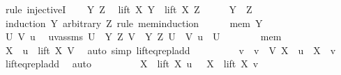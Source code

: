\begin{isabellebody}
\isamarkupfalse%
\ {\isacharparenleft}{\kern0pt}rule\ injectiveI{\isacharparenright}{\kern0pt}\isanewline
\ \ \isamarkupfalse%
\ Y\ Z\ \isamarkupfalse%
\ {\isachardoublequoteopen}lift\ X\ Y\ {\isacharequal}{\kern0pt}\ lift\ X\ Z{\isachardoublequoteclose}\isanewline
\ \ \isamarkupfalse%
\ \isamarkupfalse%
\ {\isachardoublequoteopen}Y\ {\isacharequal}{\kern0pt}\ Z{\isachardoublequoteclose}\isanewline
\ \ \isamarkupfalse%
\ {\isacharparenleft}{\kern0pt}induction\ Y\ arbitrary{\isacharcolon}{\kern0pt}\ Z\ rule{\isacharcolon}{\kern0pt}\ mem{\isacharunderscore}{\kern0pt}induction{\isacharparenright}{\kern0pt}\isanewline
\ \ \ \ \isamarkupfalse%
\ {\isacharparenleft}{\kern0pt}mem\ Y{\isacharparenright}{\kern0pt}\isanewline
\ \ \ \ \isacommand{{\isacharbraceleft}{\kern0pt}}\isamarkupfalse%
\isanewline
\ \ \ \ \ \ \isamarkupfalse%
\ U\ V\ u\ \isamarkupfalse%
\ uvassms{\isacharcolon}{\kern0pt}\ {\isachardoublequoteopen}U\ {\isasymin}\ {\isacharbraceleft}{\kern0pt}Y{\isacharcomma}{\kern0pt}\ Z{\isacharbraceright}{\kern0pt}{\isachardoublequoteclose}\ {\isachardoublequoteopen}V\ {\isasymin}\ {\isacharbraceleft}{\kern0pt}Y{\isacharcomma}{\kern0pt}\ Z{\isacharbraceright}{\kern0pt}{\isachardoublequoteclose}\ {\isachardoublequoteopen}U\ {\isasymnoteq}\ V{\isachardoublequoteclose}\ {\isachardoublequoteopen}u\ {\isasymin}\ U{\isachardoublequoteclose}\isanewline
\ \ \ \ \ \ \isamarkupfalse%
\ mem\ \isamarkupfalse%
\ {\isachardoublequoteopen}X\ {\isacharplus}{\kern0pt}\ u\ {\isasymin}\ lift\ X\ V{\isachardoublequoteclose}\ \isamarkupfalse%
\ {\isacharparenleft}{\kern0pt}auto\ simp{\isacharcolon}{\kern0pt}\ lift{\isacharunderscore}{\kern0pt}eq{\isacharunderscore}{\kern0pt}repl{\isacharunderscore}{\kern0pt}add{\isacharparenright}{\kern0pt}\isanewline
\ \ \ \ \ \ \isamarkupfalse%
\ \isamarkupfalse%
\ v\ \ {\isachardoublequoteopen}v\ {\isasymin}\ V{\isachardoublequoteclose}\ {\isachardoublequoteopen}X\ {\isacharplus}{\kern0pt}\ u\ {\isacharequal}{\kern0pt}\ X\ {\isacharplus}{\kern0pt}\ v{\isachardoublequoteclose}\ \isamarkupfalse%
\ lift{\isacharunderscore}{\kern0pt}eq{\isacharunderscore}{\kern0pt}repl{\isacharunderscore}{\kern0pt}add\ \isamarkupfalse%
\ auto\isanewline
\ \ \ \ \ \ \isamarkupfalse%
\ \isamarkupfalse%
\ {\isachardoublequoteopen}X\ {\isasymunion}\ lift\ X\ u\ \ {\isacharequal}{\kern0pt}\ X\ {\isasymunion}\ lift\ X\ v{\isachardoublequoteclose}\ \isamarkupfalse%

\end{isabellebody}
